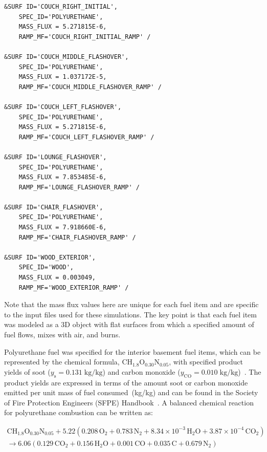 \documentclass[12pt,oneside]{book}
\renewcommand{\C}{\mbox{C}}
\renewcommand{\H}{\mbox{H}}
\renewcommand{\O}{\mbox{O}}
\newcommand{\N}{\mbox{N}}
\begin{document}
\begin{lstlisting}
&SURF ID='COUCH_RIGHT_INITIAL',
    SPEC_ID='POLYURETHANE',
    MASS_FLUX = 5.271815E-6,
    RAMP_MF='COUCH_RIGHT_INITIAL_RAMP' /

&SURF ID='COUCH_MIDDLE_FLASHOVER',
    SPEC_ID='POLYURETHANE',
    MASS_FLUX = 1.037172E-5,
    RAMP_MF='COUCH_MIDDLE_FLASHOVER_RAMP' /

&SURF ID='COUCH_LEFT_FLASHOVER',
    SPEC_ID='POLYURETHANE',
    MASS_FLUX = 5.271815E-6,
    RAMP_MF='COUCH_LEFT_FLASHOVER_RAMP' /

&SURF ID='LOUNGE_FLASHOVER',
    SPEC_ID='POLYURETHANE',
    MASS_FLUX = 7.853485E-6,
    RAMP_MF='LOUNGE_FLASHOVER_RAMP' /

&SURF ID='CHAIR_FLASHOVER',
    SPEC_ID='POLYURETHANE',
    MASS_FLUX = 7.918660E-6,
    RAMP_MF='CHAIR_FLASHOVER_RAMP' /

&SURF ID='WOOD_EXTERIOR',
    SPEC_ID='WOOD',
    MASS_FLUX = 0.003049,
    RAMP_MF='WOOD_EXTERIOR_RAMP' /
\end{lstlisting}

Note that the mass flux values here are unique for each fuel item and are specific to the input files used for these simulations. The key point is that each fuel item was modeled as a 3D object with flat surfaces from which a specified amount of fuel flows, mixes with air, and burns.

Polyurethane fuel was specified for the interior basement fuel items, which can be represented by the chemical formula, $\C\H_{1.8}\O_{0.30}\N_{0.05}$, with specified product yields of soot ($y_{\mathrm{s}}=0.131 \; \mathrm{kg}/\mathrm{kg}$) and carbon monoxide ($y_{\mathrm{CO}}=0.010 \; \mathrm{kg}/\mathrm{kg}$)~\cite{SFPE:Tewarson}. The product yields are expressed in terms of the amount soot or carbon monoxide emitted per unit mass of fuel consumed~(kg/kg) and can be found in the Society of Fire Protection Engineers (SFPE) Handbook~\cite{SFPE:Tewarson}. A balanced chemical reaction for polyurethane combustion can be written as:

\begin{multline}
\C\H_{1.8}\O_{0.30}\N_{0.05} + 5.22(0.208\,\O_{2} + 0.783\,\N_{2} + 8.34 \times 10^{-3}\,\H_{2}\O + 3.87 \times 10^{-4}\,\C\O_{2}) \\
\rightarrow 6.06(0.129\,\C\O_{2} + 0.156\,\H_{2}\O + 0.001\,\C\O + 0.035\,\C + 0.679\,\N_{2})
\label{eq:fuel_polyurethane}
\end{multline}


\clearpage
\end{document}
